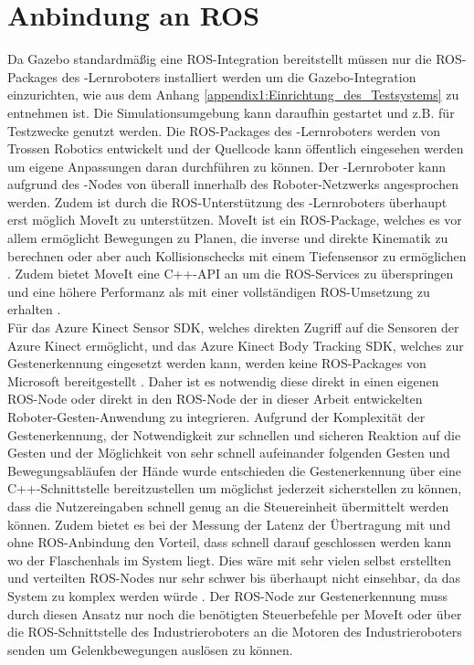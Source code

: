 \section{Anbindung an ROS}
Da Gazebo standardmäßig eine ROS-Integration bereitstellt müssen nur die ROS-Packages des -Lernroboters installiert werden um die Gazebo-Integration einzurichten, wie aus dem Anhang \ref{appendix1:Einrichtung_des_Testsystems} zu entnehmen ist. Die Simulationsumgebung kann daraufhin gestartet und z.B. für Testzwecke genutzt werden. Die ROS-Packages des -Lernroboters werden von Trossen Robotics entwickelt und der Quellcode kann öffentlich eingesehen werden um eigene Anpassungen daran durchführen zu können. Der -Lernroboter kann aufgrund des -Nodes von überall innerhalb des Roboter-Netzwerks angesprochen werden. Zudem ist durch die ROS-Unterstützung des -Lernroboters überhaupt erst möglich MoveIt zu unterstützen. MoveIt ist ein ROS-Package, welches es vor allem ermöglicht Bewegungen zu Planen, die inverse und direkte Kinematik zu berechnen oder aber auch Kollisionschecks mit einem Tiefensensor zu ermöglichen \cite{moveit_nodate}. Zudem bietet MoveIt eine C++-API an um die ROS-Services zu überspringen und eine höhere Performanz als mit einer vollständigen ROS-Umsetzung zu erhalten \cite{moveit_tutorial_nodate}.\\

Für das Azure Kinect Sensor SDK, welches direkten Zugriff auf die Sensoren der Azure Kinect ermöglicht, und das Azure Kinect Body Tracking SDK, welches zur Gestenerkennung eingesetzt werden kann, werden keine ROS-Packages von Microsoft bereitgestellt \cite{tesych_about_azure_kinect_sdks_nodate}. Daher ist es notwendig diese direkt in einen eigenen ROS-Node oder direkt in den ROS-Node der in dieser Arbeit entwickelten Roboter-Gesten-Anwendung zu integrieren. Aufgrund der Komplexität der Gestenerkennung, der Notwendigkeit zur schnellen und sicheren Reaktion auf die Gesten und der Möglichkeit von sehr schnell aufeinander folgenden Gesten und Bewegungsabläufen der Hände wurde entschieden die Gestenerkennung über eine C++-Schnittstelle bereitzustellen um möglichst jederzeit sicherstellen zu können, dass die Nutzereingaben schnell genug an die Steuereinheit übermittelt werden können. Zudem bietet es bei der Messung der Latenz der Übertragung mit und ohne ROS-Anbindung den Vorteil, dass schnell darauf geschlossen werden kann wo der Flaschenhals im System liegt. Dies wäre mit sehr vielen selbst erstellten und verteilten ROS-Nodes nur sehr schwer bis überhaupt nicht einsehbar, da das System zu komplex werden würde \cite{why_dont_we_use_ros_nodate}. Der ROS-Node zur Gestenerkennung muss durch diesen Ansatz nur noch die benötigten Steuerbefehle per MoveIt oder über die ROS-Schnittstelle des Industrieroboters an die Motoren des Industrieroboters senden um Gelenkbewegungen auslösen zu können.

